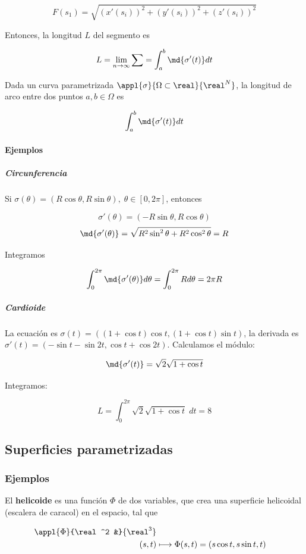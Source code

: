 \documentclass[nochap]{apuntes}
\begin{document}
\[ F(s_1) = \sqrt{(x'(s_i))^2+(y'(s_i))^2+(z'(s_i))^2} \]

Entonces, la longitud $L$ del segmento es 

\[ L = \lim_{n\to\infty} \sum = \int_a^b\md{\sigma'(t)}dt\]

\begin{theorem}
Dada un curva parametrizada $\appl{\sigma}{\Omega\subset\real}{\real^N}$, la longitud de arco entre dos puntos $a, b\in \Omega$ es 

\[ \int_a^b\md{\sigma'(t)}dt \]
\end{theorem}

\paragraph{Ejemplos}
\subparagraph{Circunferencia}
Si $\sigma(\theta) = (R\cos\theta, R\sin\theta),\; \theta \in [0, 2\pi]$, entonces 

\[ \sigma'(\theta) = (-R\sin\theta, R\cos\theta) \]
\[ \md{\sigma'(\theta)} = \sqrt{R^2 \sin^2\theta + R^2 \cos^2\theta} = R \]

Integramos

\[ \int_0^{2\pi} \md{\sigma'(\theta)}d\theta = \int_0^{2\pi} Rd\theta = 2\pi R \]

\subparagraph{Cardioide}
La ecuación es $\sigma(t) = ((1+\cos t)\cos t, (1+\cos t)\sin t)$, la derivada es $\sigma'(t) = (-\sin t - \sin 2t,\cos t + \cos 2t)$. Calculamos el módulo:

\[ \md{\sigma'(t)} = \sqrt{2}\sqrt{1+\cos t} \]

Integramos:

\[ L = \int_0^{2\pi}\sqrt{2}\sqrt{1+\cos t} \;dt = 8 \]

\subsection{Superficies parametrizadas}
\subsubsection{Ejemplos}

\label{Helicoide}
El \textbf{helicoide} es una función $\Phi$ de dos variables, que crea una superficie helicoidal (escalera de caracol) en el espacio, tal que 

\begin{align*} \appl{\Phi}{\real^2 &}{\real^3} \\
 (s,t) &\longmapsto \Phi(s,t) = (s\cos t, s\sin t, t) \end{align*}
 
\end{document}

